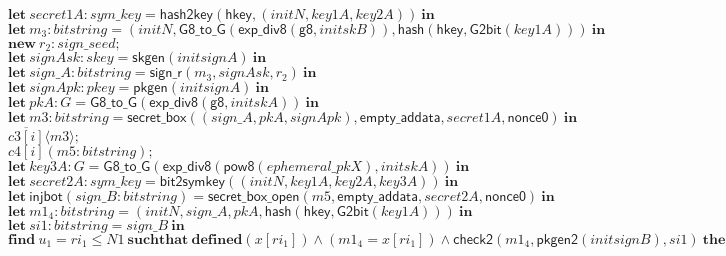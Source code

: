 \documentclass{article}
\newcommand{\cinput}[2]{{#1}({#2})}
\newcommand{\coutput}[2]{\overline{#1}\langle{#2}\rangle}
\newcommand{\kw}[1]{\mathbf{#1}}
\newcommand{\kwf}[1]{\mathsf{#1}}
\newcommand{\var}[1]{\mathit{#1}}
\newcommand{\kwt}[1]{\mathit{#1}}
\newcommand{\kwp}[1]{\mathit{#1}}
\newcommand{\kwc}[1]{\mathit{#1}}
\begin{document}
\begin{tabbing}
\>$\quad \kw{let}\ \var{secret1A}: \kwt{sym{\_}key} = \kwf{hash2key}(\kwf{hkey}, \kwf{}(\var{initN}, \var{key1A}, \var{key2A}))\ \kw{in}$\\
\>$\quad \kw{let}\ \var{m}_{3}: \kwt{bitstring} = \kwf{}(\var{initN}, \kwf{G8{\_}to{\_}G}(\kwf{exp{\_}div8}(\kwf{g8}, \var{initskB})), \kwf{hash}(\kwf{hkey}, \kwf{G2bit}(\var{key1A})))\ \kw{in}$\\
\>$\quad \kw{new}\ \var{r}_{2}: \kwt{sign{\_}seed};$\\
\>$\quad \kw{let}\ \var{signAsk}: \kwt{skey} = \kwf{skgen}(\var{initsignA})\ \kw{in}$\\
\>$\quad \kw{let}\ \var{sign{\_}A}: \kwt{bitstring} = \kwf{sign{\_}r}(\var{m}_{3}, \var{signAsk}, \var{r}_{2})\ \kw{in}$\\
\>$\quad \kw{let}\ \var{signApk}: \kwt{pkey} = \kwf{pkgen}(\var{initsignA})\ \kw{in}$\\
\>$\quad \kw{let}\ \var{pkA}: \kwt{G} = \kwf{G8{\_}to{\_}G}(\kwf{exp{\_}div8}(\kwf{g8}, \var{initskA}))\ \kw{in}$\\
\>$\quad \kw{let}\ \var{m3}: \kwt{bitstring} = \kwf{secret{\_}box}(\kwf{}(\var{sign{\_}A}, \var{pkA}, \var{signApk}), \kwf{empty{\_}addata}, \var{secret1A}, \kwf{nonce0})\ \kw{in}$\\
\>$\quad \coutput{\kwc{c3}[\var{i}]}{\var{m3}};$\\
\>$\quad \cinput{\kwc{c4}[\var{i}]}{\var{m5}: \kwt{bitstring}};$\\
\>$\quad \kw{let}\ \var{key3A}: \kwt{G} = \kwf{G8{\_}to{\_}G}(\kwf{exp{\_}div8}(\kwf{pow8}(\var{ephemeral{\_}pkX}), \var{initskA}))\ \kw{in}$\\
\>$\quad \kw{let}\ \var{secret2A}: \kwt{sym{\_}key} = \kwf{bit2symkey}(\kwf{}(\var{initN}, \var{key1A}, \var{key2A}, \var{key3A}))\ \kw{in}$\\
\>$\quad \kw{let}\ \kwf{injbot}(\var{sign{\_}B}: \kwt{bitstring}) = \kwf{secret{\_}box{\_}open}(\var{m5}, \kwf{empty{\_}addata}, \var{secret2A}, \kwf{nonce0})\ \kw{in}$\\
\>$\quad \kw{let}\ \var{m1}_{4}: \kwt{bitstring} = \kwf{}(\var{initN}, \var{sign{\_}A}, \var{pkA}, \kwf{hash}(\kwf{hkey}, \kwf{G2bit}(\var{key1A})))\ \kw{in}$\\
\>$\quad \kw{let}\ \var{si1}: \kwt{bitstring} = \var{sign{\_}B}\ \kw{in}$\\
\>$\quad \kw{find}\ \var{u}_{1} = \var{ri}_{1} \leq \kwp{N1}\ \kw{suchthat}\ \kw{defined}(\var{x}[\var{ri}_{1}])\wedge (\var{m1}_{4}  =  \var{x}[\var{ri}_{1}]) \wedge  \kwf{check2}(\var{m1}_{4}, \kwf{pkgen2}(\var{initsignB}), \var{si1})\ \kw{then}$\\

\end{tabbing}
\end{document}
